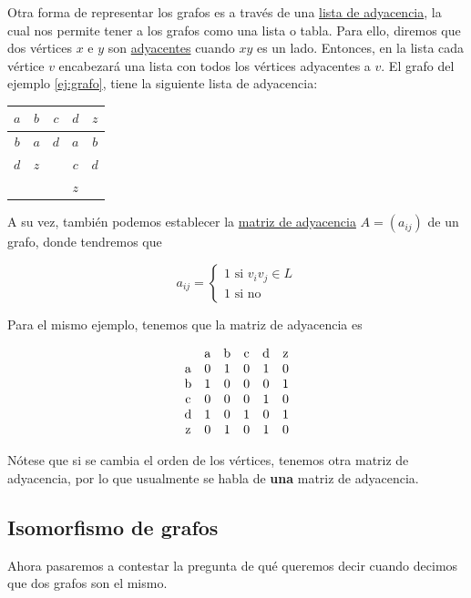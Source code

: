 Otra forma de representar los grafos es a través de una \ul{lista de adyacencia}, la cual nos permite tener a los grafos como una lista o tabla. Para ello, diremos que dos vértices $x$ e $y$ son \ul{adyacentes} cuando $xy$ es un lado. Entonces, en la lista cada vértice $v$ encabezará una lista con todos los vértices adyacentes a $v$. El grafo del ejemplo \ref{ej:grafo}, tiene la siguiente lista de adyacencia:

\begin{center}
    \begin{tabular}{ccccc}
        $a$ & $b$ & $c$ & $d$ & $z$ \\ \toprule
        $b$ & $a$ & $d$ & $a$ & $b$ \\
        $d$ & $z$ &     & $c$ & $d$ \\
            &     &     & $z$ &     
    \end{tabular}
\end{center}

A su vez, también podemos establecer la \ul{matriz de adyacencia} $A = (a_{ij})$ de un grafo, donde tendremos que

\[ a_{ij} =
\begin{cases}
    1 \text{ si } v_iv_j \in L \\
    1 \text{ si no}
\end{cases}
\]

Para el mismo ejemplo, tenemos que la matriz de adyacencia es

\[
\begin{matrix}
        & $a$ & $b$ & $c$ & $d$ & $z$ \\
    $a$ &  0  &  1  &  0  &  1  &  0  \\
    $b$ &  1  &  0  &  0  &  0  &  1  \\
    $c$ &  0  &  0  &  0  &  1  &  0  \\
    $d$ &  1  &  0  &  1  &  0  &  1  \\
    $z$ &  0  &  1  &  0  &  1  &  0
\end{matrix}
\]

Nótese que si se cambia el orden de los vértices, tenemos otra matriz de adyacencia, por lo que usualmente se habla de \textbf{una} matriz de adyacencia.

\subsection{Isomorfismo de grafos}

Ahora pasaremos a contestar la pregunta de qué queremos decir cuando decimos que dos grafos son el mismo.

